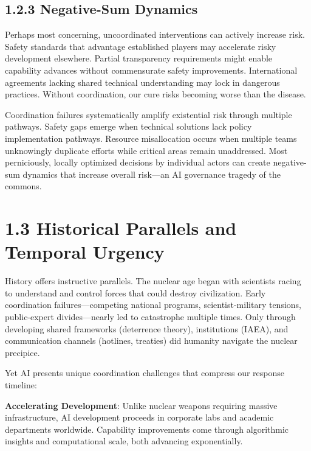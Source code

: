 \documentclass[
  11pt,
  letterpaper,
]{book}
\begin{document}
\subsection*{1.2.3 Negative-Sum Dynamics}\label{sec-negative-sum}

Perhaps most concerning, uncoordinated interventions can actively
increase risk. Safety standards that advantage established players may
accelerate risky development elsewhere. Partial transparency
requirements might enable capability advances without commensurate
safety improvements. International agreements lacking shared technical
understanding may lock in dangerous practices. Without coordination, our
cure risks becoming worse than the disease.

Coordination failures systematically amplify existential risk through
multiple pathways. Safety gaps emerge when technical solutions lack
policy implementation pathways. Resource misallocation occurs when
multiple teams unknowingly duplicate efforts while critical areas remain
unaddressed. Most perniciously, locally optimized decisions by
individual actors can create negative-sum dynamics that increase overall
risk---an AI governance tragedy of the commons.

\section*{1.3 Historical Parallels and Temporal
Urgency}\label{sec-historical-urgency}


History offers instructive parallels. The nuclear age began with
scientists racing to understand and control forces that could destroy
civilization. Early coordination failures---competing national programs,
scientist-military tensions, public-expert divides---nearly led to
catastrophe multiple times. Only through developing shared frameworks
(deterrence theory), institutions (IAEA), and communication channels
(hotlines, treaties) did humanity navigate the nuclear precipice.

Yet AI presents unique coordination challenges that compress our
response timeline:

\textbf{Accelerating Development}: Unlike nuclear weapons requiring
massive infrastructure, AI development proceeds in corporate labs and
academic departments worldwide. Capability improvements come through
algorithmic insights and computational scale, both advancing
exponentially.
\end{document}
